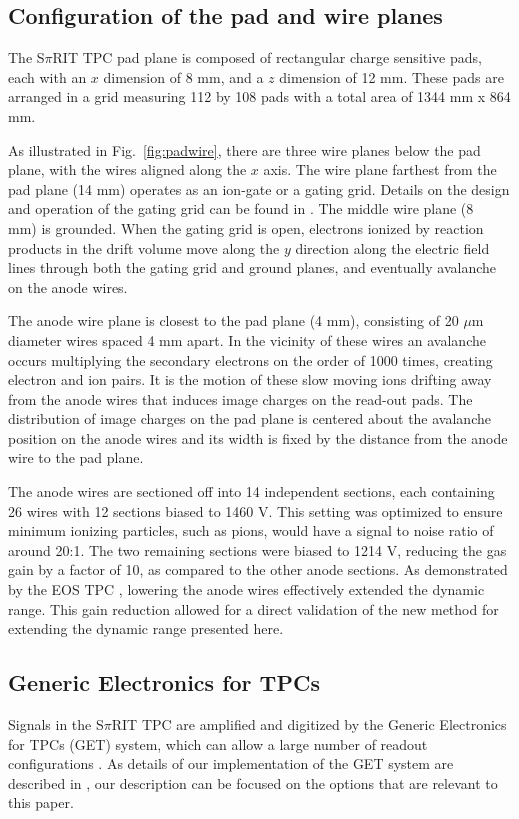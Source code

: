 \documentclass[review]{elsarticle}
\begin{document}
\subsection{Configuration of the pad and wire planes} 
The S$\pi$RIT TPC pad plane is composed of rectangular charge sensitive pads, each with an $x$ dimension of 8 mm, and a $z$ dimension of 12 mm. These pads are arranged in a grid measuring 112 by 108 pads with a total area of 1344 mm x 864 mm.

As illustrated in Fig.~\ref{fig:padwire}, there are three wire planes below the pad plane, with the wires aligned along the $x$ axis. The wire plane farthest from the pad plane (14 mm) operates as an ion-gate or a gating grid. Details on the design and operation of the gating grid can be found in \cite{suwat}. The middle wire plane (8~ mm) is grounded. When the gating grid is open, electrons ionized by reaction products in the drift volume move along the $y$ direction along the electric field lines through both the gating grid and ground planes, and eventually avalanche on the anode wires. 

The anode wire plane is closest to the pad plane (4 mm), consisting of 20 $\mu$m diameter wires spaced 4 mm apart. In the vicinity of these wires an avalanche occurs multiplying the secondary electrons on the order of 1000 times, creating electron and ion pairs. It is the motion of these slow moving ions drifting away from the anode wires that induces image charges on the read-out pads. The distribution of image charges on the pad plane is centered about the avalanche position on the anode wires and its width is fixed by the distance from the anode wire to the pad plane. 

The anode wires are sectioned off into 14 independent sections, each containing 26 wires with 12 sections biased to 1460 V. This setting was optimized to ensure minimum ionizing particles, such as pions, would have a signal to noise ratio of around 20:1. The two remaining sections were biased to 1214 V, reducing the gas gain by a factor of 10, as compared to the other anode sections. As demonstrated by the EOS TPC \citep{eos}, lowering the anode wires effectively extended the dynamic range.  This gain reduction allowed for a direct validation of the new method for extending the dynamic range presented here. 

\subsection{Generic Electronics for TPCs}
Signals in the S$\pi$RIT TPC are amplified and digitized by the Generic Electronics for TPCs (GET) system, which can allow a large number of readout configurations \cite{get}. As details of our implementation of the GET system are described in \citep{aki}, our description can be focused on the options that are relevant to this paper.
\end{document}

